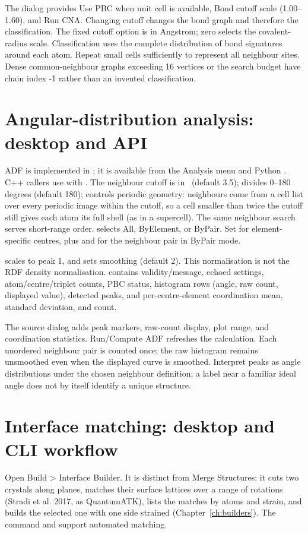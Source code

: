 The dialog provides Use PBC when unit cell is available, Bond cutoff scale (1.00--1.60), and Run CNA. Changing cutoff changes the bond graph and therefore the classification. The fixed cutoff option is in Angstrom; zero selects the covalent-radius scale. Classification uses the complete distribution of bond signatures around each atom. Repeat small cells sufficiently to represent all neighbour sites. Dense common-neighbour graphs exceeding 16 vertices or the search budget have chain index -1 rather than an invented classification.

\section{Angular-distribution analysis: desktop and API}
ADF is implemented in ; it is available from the Analysis menu and Python . C++ callers use  with . The neighbour cutoff  is in \angstrom\ (default 3.5);  divides 0--180 degrees (default 180);  controls periodic geometry: neighbours come from a cell list over every periodic image within the cutoff, so a cell smaller than twice the cutoff still gives each atom its full shell (as in a supercell). The same neighbour search serves short-range order.  selects All, ByElement, or ByPair. Set  for element-specific centres, plus  and  for the neighbour pair in ByPair mode.

 scales to peak 1, and  sets smoothing (default 2). This normalisation is not the RDF density normalisation.  contains validity/message, echoed settings, atom/centre/triplet counts, PBC status, histogram rows (angle, raw count, displayed value), detected peaks, and per-centre-element coordination mean, standard deviation, and count.

The source dialog adds peak markers, raw-count display, plot range, and coordination statistics. Run/Compute ADF refreshes the calculation. Each unordered neighbour pair is counted once; the raw histogram remains unsmoothed even when the displayed curve is smoothed. Interpret peaks as angle distributions under the chosen neighbour definition; a label near a familiar ideal angle does not by itself identify a unique structure.

\section{Interface matching: desktop and CLI workflow}
Open Build > Interface Builder. It is distinct from Merge Structures: it cuts two crystals along planes, matches their surface lattices over a range of rotations (Stradi et al. 2017, as QuantumATK), lists the matches by atoms and strain, and builds the selected one with one side strained (Chapter~\ref{ch:builders}). The  command and  support automated matching.

